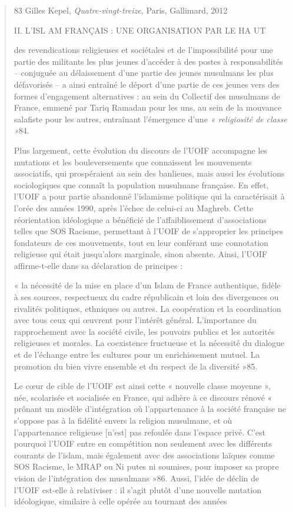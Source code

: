 \begin{quote}
83 Gilles Kepel, \emph{Quatre-vingt-treize,} Paris, Gallimard, 2012

II. L'ISL AM FRANÇAIS : UNE ORGANISATION PAR LE HA UT

des revendications religieuses et sociétales et de l'impossibilité pour
une partie des militants les plus jeunes d'accéder à des postes à
responsabilités -- conjuguée au délaissement d'une partie des jeunes
musulmans les plus défavorisés -- a ainsi entraîné le déport d'une
partie de ces jeunes vers des formes d'engagement alternatives : au sein
du Collectif des musulmans de France, emmené par Tariq Ramadan pour les
uns, au sein de la mouvance salafiste pour les autres, entraînant
l'émergence d'une \emph{« religiosité de classe »}84.

Plus largement, cette évolution du discours de l'UOIF accompagne les
mutations et les bouleversements que connaissent les mouvements
associatifs, qui prospéraient au sein des banlieues, mais aussi les
évolutions sociologiques que connaît la population musulmane française.
En effet, l'UOIF a pour partie abandonné l'islamisme politique qui la
caractérisait à l'orée des années 1990, après l'échec de celui-ci au
Maghreb. Cette réorientation idéologique a bénéficié de
l'affaiblissement d'associations telles que SOS Racisme, permettant à
l'UOIF de s'approprier les principes fondateurs de ces mouvements, tout
en leur conférant une connotation religieuse qui était jusqu'alors
marginale, sinon absente. Ainsi, l'UOIF affirme-t-elle dans sa
déclaration de principes :

« la nécessité de la mise en place d'un Islam de France authentique,
fidèle à ses sources, respectueux du cadre républicain et loin des
divergences ou rivalités politiques, ethniques ou autres. La coopération
et la coordination avec tous ceux qui œuvrent pour l'intérêt général.
L'importance du rapprochement avec la société civile, les pouvoirs
publics et les autorités religieuses et morales. La coexistence
fructueuse et la nécessité du dialogue et de l'échange entre les
cultures pour un enrichissement mutuel. La promotion du bien vivre
ensemble et du respect de la diversité »85.

Le cœur de cible de l'UOIF est ainsi cette « nouvelle classe moyenne »,
née, scolarisée et socialisée en France, qui adhère à ce discours rénové
« prônant un modèle d'intégration où l'appartenance à la société
française ne s'oppose pas à la fidélité envers la religion musulmane, et
où l'appartenance religieuse {[}n'est{]} pas refoulée dans l'espace
privé. C'est pourquoi l'UOIF entre en compétition non seulement avec les
différents courants de l'islam, mais également avec des associations
laïques comme SOS Racisme, le MRAP ou Ni putes ni soumises, pour imposer
sa propre vision de l'intégration des musulmans »86. Aussi, l'idée de
déclin de l'UOIF est-elle à relativiser : il s'agit plutôt d'une
nouvelle mutation idéologique, similaire à celle opérée au tournant des
années


\end{quote}
